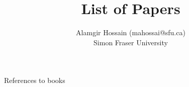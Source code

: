 \documentclass [11pt]{article}
\title{List of Papers}
\author{Alamgir Hossain (mahossai@sfu.ca)\\Simon Fraser University}
\begin{document}

\nocite{*}

%
{References to books}
\end{document}
